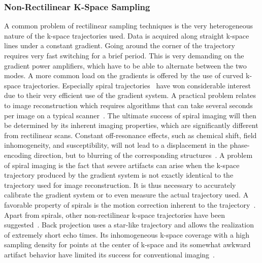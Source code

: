 \subsubsection{Non-Rectilinear K-Space Sampling}
A common problem of rectilinear sampling techniques is the very heterogeneous nature of the k-space trajectories used. Data is acquired along straight k-space lines under a constant gradient. Going around the corner of the trajectory requires very fast switching for a brief period. This is very demanding on the gradient power amplifiers, which have to be able to alternate between the two modes. A more common load on the gradients is offered by the use of curved k-space trajectories. Especially spiral trajectories~\cite{SpiralMRI, SpiralMRI2} have won considerable interest due to their very efficient use of the gradient system. A practical problem relates to image reconstruction which requires algorithms that can take several seconds per image on a typical scanner~\cite{SamplingStrategies}. The ultimate success of spiral imaging will then be determined by its inherent imaging properties, which are significantly different from rectilinear scans. Constant off-resonance effects, such as chemical shift, field inhomogeneity, and susceptibility, will not lead to a displacement in the phase-encoding direction, but to blurring of the corresponding structures~\cite{SamplingStrategies}. A problem of spiral imaging is the fact that severe artifacts can arise when the k-space trajectory produced by the gradient system is not exactly identical to the trajectory used for image reconstruction. It is thus necessary to accurately calibrate the gradient system or to even measure the actual trajectory used. A favorable property of spirals is the motion correction inherent to the trajectory~\cite{SpiralMRI3}. Apart from spirals, other non-rectilinear k-space trajectories have been suggested~\cite{NonRectlinear1,NonRectlinear2}. Back projection uses a star-like trajectory and allows the realization of extremely short echo times. Its inhomogeneous k-space coverage with a high sampling density for points at the center of k-space and its somewhat awkward artifact behavior have limited its success for conventional imaging~\cite{SamplingStrategies}. \\
